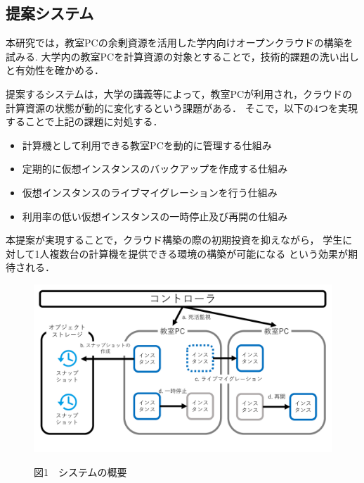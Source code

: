 \documentclass[10pt,a4paper]{jsarticle}
\begin{document}
\subsection{提案システム}
本研究では，教室PCの余剰資源を活用した学内向けオープンクラウドの構築を試みる.
大学内の教室PCを計算資源の対象とすることで，技術的課題の洗い出しと有効性を確かめる．
\par 提案するシステムは，大学の講義等によって，教室PCが利用され，クラウドの計算資源の状態が動的に変化するという課題がある．
そこで，以下の4つを実現することで上記の課題に対処する．
\begin{itemize}
	\item 計算機として利用できる教室PCを動的に管理する仕組み
	\item 定期的に仮想インスタンスのバックアップを作成する仕組み
	\item 仮想インスタンスのライブマイグレーションを行う仕組み
	\item 利用率の低い仮想インスタンスの一時停止及び再開の仕組み
\end{itemize}

\par 本提案が実現することで，クラウド構築の際の初期投資を抑えながら，
学生に対して1人複数台の計算機を提供できる環境の構築が可能になる
という効果が期待される．


\begin{figure}[h]
    \includegraphics[scale=0.47]{graph1.pdf}
	\begin{center}図1　システムの概要\end{center}
	\label{fig:graph1}
\end{figure}
\end{document}
